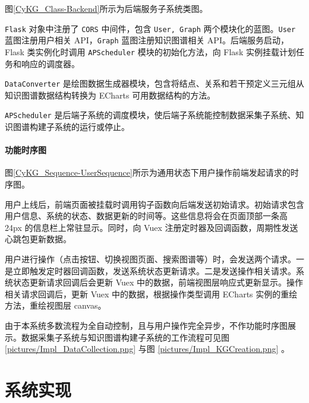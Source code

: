 \documentclass[a4paper,AutoFakeBold,oneside,12pt]{book}
\begin{document}

图\ref{CyKG_Class-Backend}所示为后端服务子系统类图。

\lstinline|Flask| 对象中注册了 \lstinline|CORS| 中间件，包含 \lstinline|User, Graph| 两个模块化的蓝图。\lstinline|User| 蓝图注册用户相关 API，\lstinline|Graph| 蓝图注册知识图谱相关 API。后端服务启动，Flask 类实例化时调用 \lstinline|APScheduler| 模块的初始化方法，向 Flask 实例挂载计划任务和响应的调度器。

\lstinline|DataConverter| 是绘图数据生成器模块，包含将结点、关系和若干预定义三元组从知识图谱数据结构转换为 ECharts 可用数据结构的方法。

\lstinline|APScheduler| 是后端子系统的调度模块，使后端子系统能控制数据采集子系统、知识图谱构建子系统的运行或停止。

\subsubsection{功能时序图}

图\ref{CyKG_Sequence-UserSequence}所示为通用状态下用户操作前端发起请求的时序图。


用户上线后，前端页面被挂载时调用钩子函数向后端发送初始请求。初始请求包含用户信息、系统的状态、数据更新的时间等。这些信息将会在页面顶部一条高 24px 的信息栏上常驻显示。同时，向 Vuex 注册定时器及回调函数，周期性发送心跳包更新数据。

用户进行操作（点击按钮、切换视图页面、搜索图谱等）时，会发送两个请求。一是立即触发定时器回调函数，发送系统状态更新请求。二是发送操作相关请求。系统状态更新请求回调后会更新 Vuex 中的数据，前端视图层响应式更新显示。操作相关请求回调后，更新 Vuex 中的数据，根据操作类型调用 ECharts 实例的重绘方法，重绘视图层 canvas。

由于本系统多数流程为全自动控制，且与用户操作完全异步，不作功能时序图展示。数据采集子系统与知识图谱构建子系统的工作流程可见图 \ref{pictures/Impl_DataCollection.png} 与图 \ref{pictures/Impl_KGCreation.png} 。

\chapter{系统实现}
\end{document}
